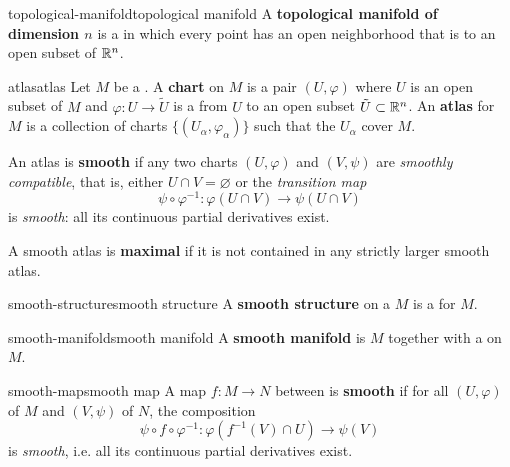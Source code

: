 \begin{topic}{topological-manifold}{topological manifold}
    A \textbf{topological manifold of dimension $n$} is a    in which every point has an open neighborhood that is  to an open subset of $\mathbb{R}^n$.
\end{topic}

\begin{topic}{atlas}{atlas}
    Let $M$ be a . A \textbf{chart} on $M$ is a pair $(U, \varphi)$ where $U$ is an open subset of $M$ and $\varphi : U \to \tilde{U}$ is a  from $U$ to an open subset $\tilde{U} \subset \mathbb{R}^n$. An \textbf{atlas} for $M$ is a collection of charts $\{ (U_\alpha, \varphi_\alpha) \}$ such that the $U_\alpha$ cover $M$.
    
    An atlas is \textbf{smooth} if any two charts $(U, \varphi)$ and $(V, \psi)$ are \textit{smoothly compatible}, that is, either $U \cap V = \varnothing$ or the \textit{transition map}
    \[ \psi \circ \varphi^{-1} : \varphi(U \cap V) \to \psi(U \cap V) \]
    is \textit{smooth}: all its continuous partial derivatives exist.
    
    A smooth atlas is \textbf{maximal} if it is not contained in any strictly larger smooth atlas.
\end{topic}

\begin{topic}{smooth-structure}{smooth structure}
    A \textbf{smooth structure} on a  $M$ is a  for $M$.
\end{topic}

\begin{topic}{smooth-manifold}{smooth manifold}
    A \textbf{smooth manifold} is  $M$ together with a  on $M$.
\end{topic}

\begin{topic}{smooth-map}{smooth map}
    A map $f : M \to N$ between  is \textbf{smooth} if for all  $(U, \varphi)$ of $M$ and $(V, \psi)$ of $N$, the composition
    \[ \psi \circ f \circ \varphi^{-1} : \varphi(f^{-1}(V) \cap U) \to \psi(V) \]
    is \textit{smooth}, i.e. all its continuous partial derivatives exist.
\end{topic}

